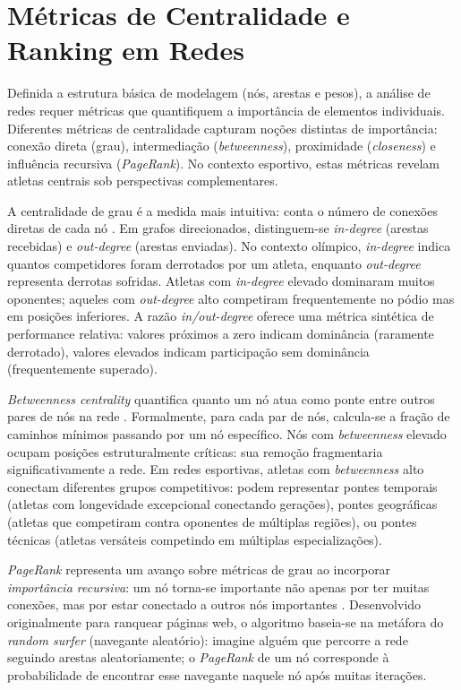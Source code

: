 \section{Métricas de Centralidade e Ranking em Redes}

Definida a estrutura básica de modelagem (nós, arestas e pesos), a análise de redes requer métricas que quantifiquem a importância de elementos individuais. Diferentes métricas de centralidade capturam noções distintas de importância: conexão direta (grau), intermediação (\textit{betweenness}), proximidade (\textit{closeness}) e influência recursiva (\textit{PageRank}). No contexto esportivo, estas métricas revelam atletas centrais sob perspectivas complementares.

A centralidade de grau é a medida mais intuitiva: conta o número de conexões diretas de cada nó \cite{Freeman1979Centrality}. Em grafos direcionados, distinguem-se \textit{in-degree} (arestas recebidas) e \textit{out-degree} (arestas enviadas). No contexto olímpico, \textit{in-degree} indica quantos competidores foram derrotados por um atleta, enquanto \textit{out-degree} representa derrotas sofridas. Atletas com \textit{in-degree} elevado dominaram muitos oponentes; aqueles com \textit{out-degree} alto competiram frequentemente no pódio mas em posições inferiores. A razão \textit{in/out-degree} oferece uma métrica sintética de performance relativa: valores próximos a zero indicam dominância (raramente derrotado), valores elevados indicam participação sem dominância (frequentemente superado).

\textit{Betweenness centrality} quantifica quanto um nó atua como ponte entre outros pares de nós na rede \cite{Freeman1979Centrality}. Formalmente, para cada par de nós, calcula-se a fração de caminhos mínimos passando por um nó específico. Nós com \textit{betweenness}{} elevado ocupam posições estruturalmente críticas: sua remoção fragmentaria significativamente a rede. Em redes esportivas, atletas com \textit{betweenness}{} alto conectam diferentes grupos competitivos: podem representar pontes temporais (atletas com longevidade excepcional conectando gerações), pontes geográficas (atletas que competiram contra oponentes de múltiplas regiões), ou pontes técnicas (atletas versáteis competindo em múltiplas especializações).

\textit{PageRank} representa um avanço sobre métricas de grau ao incorporar \textit{importância recursiva}: um nó torna-se importante não apenas por ter muitas conexões, mas por estar conectado a outros nós importantes \cite{Brin1998PageRank}. Desenvolvido originalmente para ranquear páginas web, o algoritmo baseia-se na metáfora do \textit{random surfer} (navegante aleatório): imagine alguém que percorre a rede seguindo arestas aleatoriamente; o \textit{PageRank} de um nó corresponde à probabilidade de encontrar esse navegante naquele nó após muitas iterações.


